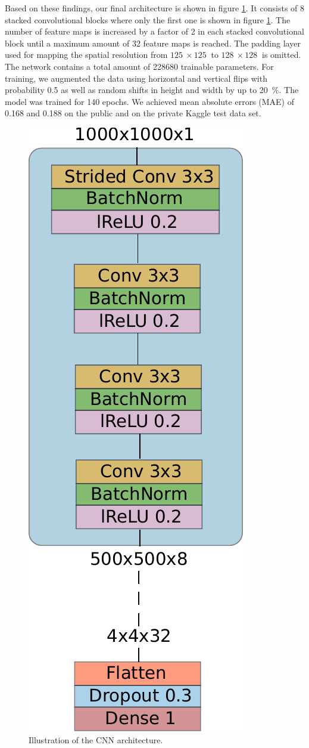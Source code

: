 \documentclass[10pt,conference,compsocconf]{IEEEtran}
\begin{document}
Based on these findings, our final architecture is shown in figure \ref{fig:nn_classifier_arch}. It consists of 8 stacked convolutional blocks where only the first one is shown in figure \ref{fig:nn_classifier_arch}. The number of feature maps is increased by a factor of 2 in each stacked convolutional block until a maximum amount of \SI{32}{} feature maps is reached. The padding layer used for mapping the spatial resolution from $\SI{125}{}\times\SI{125}{}$ to $\SI{128}{}\times\SI{128}{}$ is omitted. The network contains a total amount of \SI{228680}{} trainable parameters.
For training, we augmented the data using horizontal and vertical flips with probability \SI{0.5}{} as well as random shifts in height and width by up to \SI{20}{\percent}. The model was trained for \SI{140}{} epochs. We achieved mean absolute errors (MAE) of \SI{0.168}{} and \SI{0.188}{} on the public and on the private Kaggle test data set. 



\begin{figure}
    \centering
    \includegraphics[width=0.4\columnwidth]{assets/nn_classifier_arch.pdf}
    \caption{Illustration of the CNN architecture.}
    \label{fig:nn_classifier_arch}
\end{figure}
\end{document}
